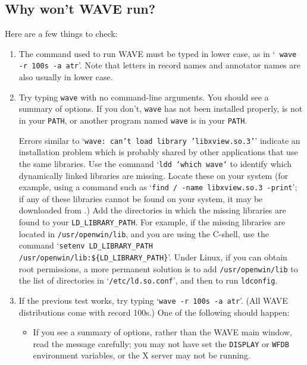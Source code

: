 \documentclass[twoside]{book}
\newcommand{\WAVE}{{\sf WAVE}\xspace}
\begin{document}
\subsection{Why won't \WAVE{} run?}

Here are a few things to check:

\begin{enumerate}
\item
{}
The command used to run \WAVE{} must be typed in lower case, as in `{\tt
wave -r 100s -a atr}'.  Note that letters in record names and
annotator names are also usually in lower case.

\item
{}
Try typing {\tt wave} with no command-line arguments.  You should see a summary
of options.  If you don't, {\tt wave} has not been installed properly, is not
in your {\tt PATH}, or another program named {\tt wave} is in your {\tt PATH}.

Errors similar to `{\tt wave: can't load library 'libxview.so.3'}'
indicate an installation problem which is probably shared by other
applications that use the same libraries.
Use the command `{\tt ldd `which wave`} to identify which dynamically
linked libraries are missing.  Locate these on your system (for
example, using a command such as `{\tt find / -name libxview.so.3
-print}';  if any of these libraries cannot be found on your system, it may be
downloaded from .)
Add the directories in which the missing libraries are found to your
{\tt LD\_LIBRARY\_PATH}.  For example, if the missing libraries are
located in {\tt /usr/openwin/lib}, and you are using the C-shell, use the
command `{\tt setenv LD\_LIBRARY\_PATH /usr/openwin/lib:\$\{LD\_LIBRARY\_PATH\}}'.
Under Linux, if you can obtain root permissions, a more permanent
solution is to add {\tt /usr/openwin/lib} to the list of directories
in `{\tt /etc/ld.so.conf}', and then to run {\tt ldconfig}.

\item
If the previous test works, try typing `{\tt wave -r 100s -a atr}'.  (All
\WAVE{} distributions come with record 100s.)  One of the following should
happen:
\begin{itemize}
\item
{}
If you see a summary of options, rather than the \WAVE{} main window, read
the message carefully;  you may not have set the {\tt DISPLAY} or {\tt WFDB}
environment variables, or the X server may not be running.


\end{itemize}
\end{enumerate}
\end{document}
